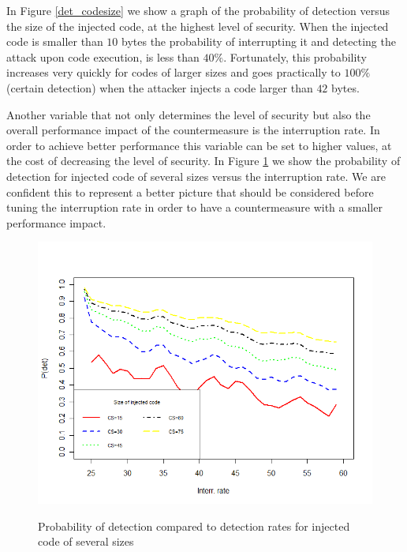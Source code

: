 In Figure \ref{det_codesize} we show a graph of the probability of detection versus the size of the injected code, at the highest level of security. When the injected code is smaller than $10$ bytes the probability of interrupting it and detecting the attack upon code execution, is less than $40\%$.
Fortunately, this probability increases very quickly for codes of larger sizes and goes practically to $100\%$ (certain detection) when the attacker injects a code larger than $42$ bytes.  

Another variable that not only determines the level of security but also the overall performance impact of the countermeasure is the interruption rate. In order to achieve better performance this variable can be set to higher values, at the cost of decreasing the level of security. In Figure \ref{det_intrate} we show the probability of detection for injected code of several sizes versus the interruption rate. We are confident this to represent a better picture that should be considered before tuning the interruption rate in order to have a countermeasure with a smaller performance impact.


\begin{figure}[htbp] 
\begin{center}
\includegraphics[scale=0.5]{images/bubble_det_intrate}
\caption{{Probability of detection compared to detection rates for injected code of several sizes}}
\vspace{0.3cm}
\label{det_intrate}
\end{center}
\end{figure}



